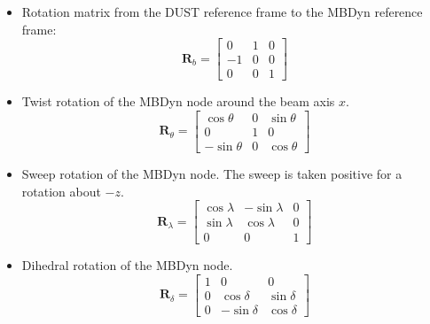 \begin{itemize}
    \item Rotation matrix from the DUST reference frame to the MBDyn reference frame:
    \begin{equation}
        \mathbf{R}_{b} = 
        \begin{bmatrix}
            0 & 1 & 0\\
            -1 & 0 & 0\\
            0 & 0 & 1
        \end{bmatrix}
        \label{eq:rotbeam}
    \end{equation}

    \item Twist rotation of the MBDyn node around the beam axis $x$. 
    \begin{equation}
        \mathbf{R}_{\theta} = 
        \begin{bmatrix}
            \cos \theta & 0 & \sin\theta\\ 
            0 & 1 & 0\\ 
            -\sin\theta & 0 & \cos\theta
        \end{bmatrix}
        \label{eq:rottwist}
    \end{equation}
    
    \item Sweep rotation of the MBDyn node. The sweep is taken positive for a rotation about $-z$. 
    \begin{equation}
        \mathbf{R}_{\lambda} = 
        \begin{bmatrix}
            \cos\lambda & -\sin\lambda & 0\\ 
            \sin\lambda & \cos\lambda & 0\\ 
            0 & 0 & 1 
        \end{bmatrix}
        \label{eq:rotsweep}
    \end{equation}
    
    \item Dihedral rotation of the MBDyn node. 
    \begin{equation}
        \mathbf{R}_{\delta} = 
        \begin{bmatrix}
            1 & 0 & 0\\ 
            0 & \cos\delta & \sin\delta\\ 
            0 & -\sin\delta & \cos\delta 
        \end{bmatrix}
        \label{eq:rotdih}
    \end{equation}
\end{itemize}



